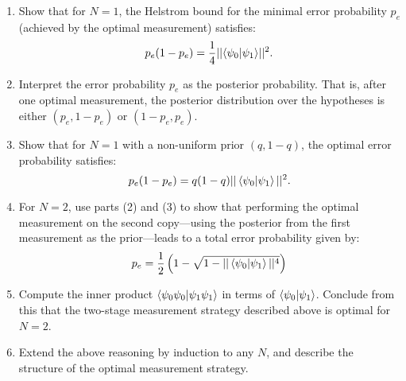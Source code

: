 \documentclass[12pt,a4paper]{article}
\begin{document}
\begin{enumerate}
    \item Show that for $N = 1$, the Helstrom bound for the minimal error probability $p_e$ (achieved by the optimal measurement) satisfies:
    \[
    p_e(1 - p_e) = \frac{1}{4}||{\braket{\psi_0|\psi_1}}||^2.
    \] 
    
    \item Interpret the error probability $p_e$ as the posterior probability. That is, after one optimal measurement, the posterior distribution over the hypotheses is either $(p_e, 1 - p_e)$ or $(1 - p_e, p_e)$.

    \item Show that for $N = 1$ with a non-uniform prior $(q, 1 - q)$, the optimal error probability satisfies:
    \[
    p_e(1 - p_e) = q(1 - q)||\braket{\psi_0|\psi_1}||^2.
    \]
    

    \item For $N = 2$, use parts (2) and (3) to show that performing the optimal measurement on the second copy—using the posterior from the first measurement as the prior—leads to a total error probability given by:
    \[
    p_e = \frac{1}{2}\left( 1 - \sqrt{1 - ||\braket{\psi_0|\psi_1}||^4} \right)
    \]

    \item Compute the inner product $\braket{\psi_0\psi_0 |\psi_1 \psi_1}$ in terms of $\braket{\psi_0|\psi_1}$. Conclude from this that the two-stage measurement strategy described above is optimal for $N = 2$.

    \item Extend the above reasoning by induction to any $N$, and describe the structure of the optimal measurement strategy.
\end{enumerate}
\printbibliography 
\end{document}
